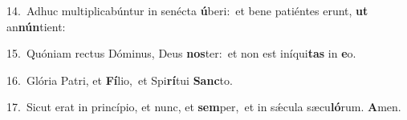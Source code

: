 {\numbfont\textcolor{\numbcolor}{14.}}~Adhuc multiplicabúntur in senécta \textbf{ú}\-beri:~\star et bene patiéntes erunt, \textbf{ut} an\-\textbf{nún}\-tient:\par
{\numbfont\textcolor{\numbcolor}{15.}}~Quóniam rectus Dóminus, Deus \textbf{nos}\-ter:~\star et non est iníqui\textbf{tas} in \textbf{e}\-o.\par
{\numbfont\textcolor{\numbcolor}{16.}}~Glória Patri, et \textbf{Fí}\-lio,~\star et Spi\-\textbf{rí}\-tui \textbf{Sanc}\-to.\par
{\numbfont\textcolor{\numbcolor}{17.}}~Sicut erat in princípio, et nunc, et \textbf{sem}\-per,~\star et in sǽcula sæcu\-\textbf{ló}\-rum. \textbf{A}\-men.\par
